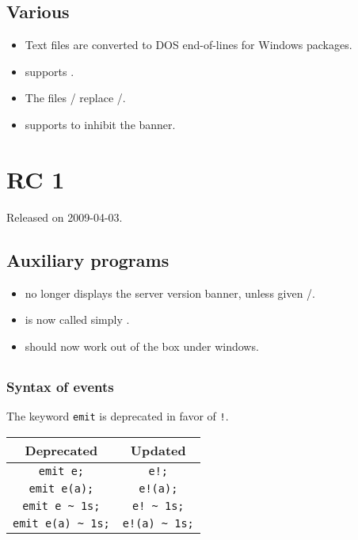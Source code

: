 \subsection{Various}

\begin{itemize}
\item Text files are converted to DOS end-of-lines for Windows packages.

\item {} supports .

\item The files / replace
  /.

\item {} supports  to inhibit the banner.
\end{itemize}

\section{ RC 1}
Released on 2009-04-03.

\subsection{Auxiliary programs}

\begin{itemize}
\item {} no longer displays the server version
  banner, unless given /.
\item {} is now called simply .
\item {} should now work out of the box under windows.
\end{itemize}


\subsection{\us}

\subsubsection{Syntax of events}

The keyword \lstinline|emit| is deprecated in favor of \lstinline|!|.

\begin{center}
  \begin{tabular}{|c|c|}
    \hline
    Deprecated & Updated \\
    \hline
    \lstinline|emit e;| &              \lstinline|e!;| \\
    \lstinline|emit e(a);| &           \lstinline|e!(a);| \\
    \lstinline|emit e ~ 1s;| &         \lstinline|e! ~ 1s;| \\
    \lstinline|emit e(a) ~ 1s;| &      \lstinline|e!(a) ~ 1s;| \\
    \hline
  \end{tabular}
\end{center}

